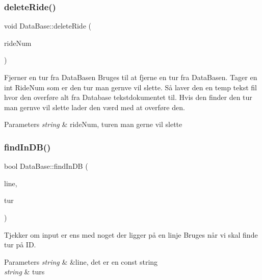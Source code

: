 \subsubsection{\texorpdfstring{delete\+Ride()}{deleteRide()}}
{\footnotesize\ttfamily void Data\+Base\+::delete\+Ride (\begin{DoxyParamCaption}\item[{string}]{ride\+Num }\end{DoxyParamCaption})}



Fjerner en tur fra Data\+Basen Bruges til at fjerne en tur fra Data\+Basen. Tager en int Ride\+Num som er den tur man gernve vil slette. Så laver den en temp tekst fil hvor den overføre alt fra Database tekstdokumentet til. Hvis den finder den tur man gernve vil slette lader den værd med at overføre den. 


\begin{DoxyParams}{Parameters}
{\em string} & ride\+Num, turen man gerne vil slette \\
\hline
\end{DoxyParams}
\mbox{\label{classDataBase_a90b58b8a905fb9a66eea7a2e74f6c207}} 
\subsubsection{\texorpdfstring{find\+In\+D\+B()}{findInDB()}}
{\footnotesize\ttfamily bool Data\+Base\+::find\+In\+DB (\begin{DoxyParamCaption}\item[{const string \&}]{line,  }\item[{string}]{tur }\end{DoxyParamCaption})}



Tjekker om input er ens med noget der ligger på en linje Bruges når vi skal finde tur på ID. 


\begin{DoxyParams}{Parameters}
{\em string} & \&line, det er en const string \\
\hline
{\em string} & turs \\
\hline
\end{DoxyParams}
\mbox{\label{classDataBase_afc5c8eb0a4af1217df3c0590550f4854}} 
